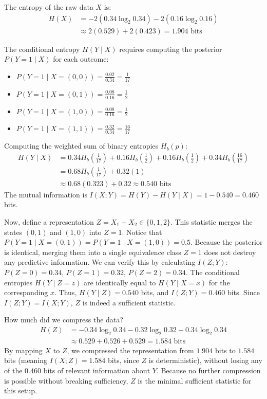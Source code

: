 The entropy of the raw data $X$ is:
\begin{align*}
H(X) &= -2(0.34 \log_2 0.34) - 2(0.16 \log_2 0.16) \\
&\approx 2(0.529) + 2(0.423) = 1.904 \text{ bits}
\end{align*}

The conditional entropy $H(Y \mid X)$ requires computing the posterior $P(Y=1 \mid X)$ for each outcome:
\begin{itemize}
    \item $P(Y=1 \mid X=(0,0)) = \frac{0.02}{0.34} = \frac{1}{17}$
    \item $P(Y=1 \mid X=(0,1)) = \frac{0.08}{0.16} = \frac{1}{2}$
    \item $P(Y=1 \mid X=(1,0)) = \frac{0.08}{0.16} = \frac{1}{2}$
    \item $P(Y=1 \mid X=(1,1)) = \frac{0.32}{0.34} = \frac{16}{17}$
\end{itemize}

Computing the weighted sum of binary entropies $H_b(p)$:
\begin{align*}
H(Y \mid X) &= 0.34 H_b\left(\frac{1}{17}\right) + 0.16 H_b\left(\frac{1}{2}\right) + 0.16 H_b\left(\frac{1}{2}\right) + 0.34 H_b\left(\frac{16}{17}\right) \\
&= 0.68 H_b\left(\frac{1}{17}\right) + 0.32(1) \\
&\approx 0.68(0.323) + 0.32 \approx 0.540 \text{ bits}
\end{align*}
The mutual information is $I(X; Y) = H(Y) - H(Y \mid X) = 1 - 0.540 = 0.460$ bits.

Now, define a representation $Z = X_1 + X_2 \in \{0, 1, 2\}$. This statistic merges the states $(0,1)$ and $(1,0)$ into $Z=1$.
Notice that $P(Y=1 \mid X=(0,1)) = P(Y=1 \mid X=(1,0)) = 0.5$. Because the posterior is identical, merging them into a single equivalence class $Z=1$ does not destroy any predictive information.
We can verify this by calculating $I(Z; Y)$:
$P(Z=0) = 0.34$, $P(Z=1) = 0.32$, $P(Z=2) = 0.34$.
The conditional entropies $H(Y \mid Z=z)$ are identically equal to $H(Y \mid X=x)$ for the corresponding $x$.
Thus, $H(Y \mid Z) = 0.540$ bits, and $I(Z; Y) = 0.460$ bits.
Since $I(Z; Y) = I(X; Y)$, $Z$ is indeed a sufficient statistic.

How much did we compress the data?
\begin{align*}
H(Z) &= -0.34 \log_2 0.34 - 0.32 \log_2 0.32 - 0.34 \log_2 0.34 \\
&\approx 0.529 + 0.526 + 0.529 = 1.584 \text{ bits}
\end{align*}
By mapping $X$ to $Z$, we compressed the representation from $1.904$ bits to $1.584$ bits (meaning $I(X; Z) = 1.584$ bits, since $Z$ is deterministic), without losing any of the $0.460$ bits of relevant information about $Y$. Because no further compression is possible without breaking sufficiency, $Z$ is the minimal sufficient statistic for this setup.

